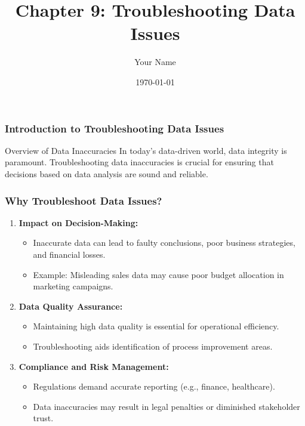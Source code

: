 \documentclass{beamer}
\title{Chapter 9: Troubleshooting Data Issues}
\author{Your Name}
\institute{Your Institution}
\date{\today}
\begin{document}
\frame{\titlepage}

\begin{frame}[fragile]
    \frametitle{Introduction to Troubleshooting Data Issues}
    \begin{block}{Overview of Data Inaccuracies}
        In today's data-driven world, data integrity is paramount. Troubleshooting data inaccuracies is crucial for ensuring that decisions based on data analysis are sound and reliable.
    \end{block}
\end{frame}

\begin{frame}[fragile]
    \frametitle{Why Troubleshoot Data Issues?}
    \begin{enumerate}
        \item \textbf{Impact on Decision-Making:}
            \begin{itemize}
                \item Inaccurate data can lead to faulty conclusions, poor business strategies, and financial losses.
                \item Example: Misleading sales data may cause poor budget allocation in marketing campaigns.
            \end{itemize}
        \item \textbf{Data Quality Assurance:}
            \begin{itemize}
                \item Maintaining high data quality is essential for operational efficiency.
                \item Troubleshooting aids identification of process improvement areas.
            \end{itemize}
        \item \textbf{Compliance and Risk Management:}
            \begin{itemize}
                \item Regulations demand accurate reporting (e.g., finance, healthcare).
                \item Data inaccuracies may result in legal penalties or diminished stakeholder trust.
            \end{itemize}
    \end{enumerate}
\end{frame}
\end{document}

